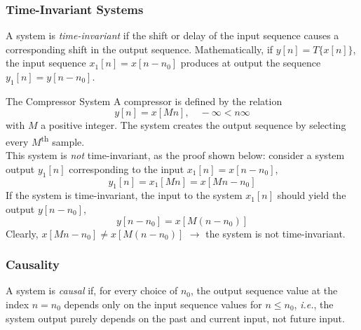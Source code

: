 \subsubsection{Time-Invariant Systems}
A system is \textit{time-invariant} if the shift or delay of the input sequence causes a corresponding shift in the output sequence. Mathematically, if $y[n] = T\{x[n]\}$, the input sequence $x_{1}[n]=x[n-n_0]$ produces at output the sequence $y_{1}[n]=y[n-n_0]$. 

\begin{ex}{The Compressor System}
A compressor is defined by the relation
\[
    y[n] = x[Mn], \quad -\infty < n \infty
\]
with $M$ a positive integer. The system creates the output sequence by selecting every $M$\textsuperscript{th} sample. \\

This system is \textit{not} time-invariant, as the proof shown below: consider a system output $y_1[n]$ corresponding to the input $x_1[n]=x[n-n_0]$, 
\[
    y_1[n] = x_1[Mn] = x[Mn-n_0]
\]
If the system is time-invariant, the input to the system $x_1[n]$ should yield the output $y[n-n_0]$,
\[
    y[n-n_0] = x[M(n-n_0)]
\]
Clearly, $x[Mn-n_0] \neq x[M(n-n_0)]$ $\to$ the system is not time-invariant. 
\end{ex}
\subsubsection{Causality}
A system is \textit{causal} if, for every choice of $n_0$, the output sequence value at the index $n=n_0$ depends only on the input sequence values for $n\leq n_0$, \textit{i.e.}, the system output purely depends on the past and current input, not future input. 

